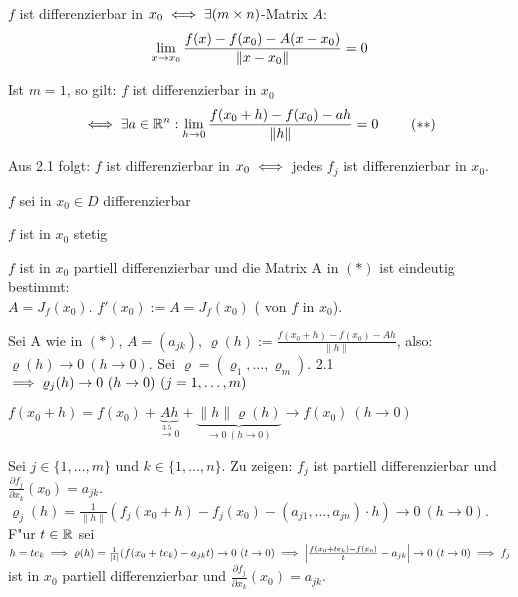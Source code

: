 \documentclass[a4paper,twoside,DIV15,BCOR12mm,chapterprefix=true,headings=twolinechapter]{scrbook}
\begin{document}
\begin{bemerkungen}
\item $f$ ist differenzierbar in $x_0\iff\exists (m \times n)$-Matrix $A$: $$\displaystyle\lim_{x\to x_0}\frac{f(x)-f(x_0)-A(x-x_0)}{\|x-x_0\|}=0$$
\item Ist $m=1$, so gilt: $f$ ist differenzierbar in $x_0$ 
\begin{align*}
\iff\exists a \in\mathbb{R}^n:\displaystyle\lim_{h\to 0}\frac{f(x_0+h)-f(x_0)-ah}{\|h\|}=0\ \tag{$**$}
\end{align*}
\item Aus 2.1 folgt: $f$ ist differenzierbar in $x_0\iff$ jedes $f_j$ ist differenzierbar in $x_0$.
\end{bemerkungen}

\begin{satz}
$f$ sei in $x_0\in D$ differenzierbar
\begin{liste}
\item $f$ ist in $x_0$ stetig
\item $f$ ist in $x_0$ partiell differenzierbar und die Matrix A in $(*)$ ist eindeutig bestimmt: \\$A=J_f(x_0)$. $f'(x_0):=A=J_f(x_0)$ ( von $f$ in $x_0$).
\end{liste}
\end{satz}

\begin{beweis}
Sei A wie in $(*)$, $A=(a_{jk})$, $\varrho(h):=\frac{f(x_0+h)-f(x_0)-Ah}{\|h\|}$, also: $\varrho(h)\to0\ (h\to 0)$. Sei $\varrho=(\varrho_1,\ldots,\varrho_m)$. 2.1 $\folgt \varrho_j(h)\to 0\ (h\to 0)\ (j=1,\ldots,m)$
\begin{liste}
\item $f(x_0+h)=f(x_0)+\underbrace{Ah}_{\overset{\text{3.5}}{\to}0}+\underbrace{\|h\|\varrho(h)}_{\to 0\ (h\to 0)}\to f(x_0)\ (h\to 0)$
\item Sei $j\in\{1,\ldots,m\}$ und $k\in\{1,\ldots,n\}$. Zu zeigen: $f_j$ ist partiell differenzierbar und $\frac{\partial f_j}{\partial x_k}(x_0)=a_{jk}$. $\varrho_j(h)=\frac{1}{\|h\|}(f_j(x_0+h)-f_j(x_0)-(a_{j1},\ldots,a_{jn})\cdot h)\to 0\ (h \to 0)$. F"ur $t\in\mathbb{R}$ sei $h=te_k\folgt\varrho(h)=\frac{1}{|t|}(f(x_0+te_k)-a_{jk}t)\to 0\ (t\to 0)\folgt\left|\frac{f(x_0+te_k)-f(x_0)}{t}-a_{jk}\right|\to 0\ (t\to 0)\folgt f_j$ ist in $x_0$ partiell differenzierbar und $\frac{\partial f_j}{\partial x_k}(x_0)=a_{jk}$.
\end{liste}
\end{beweis}
\end{document}
